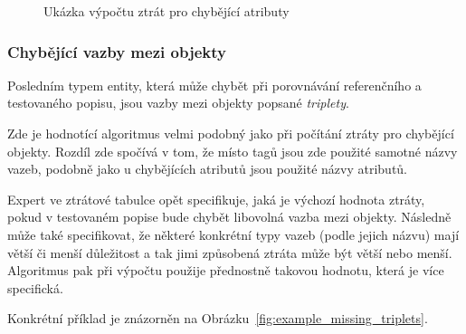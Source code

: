 \begin{figure}[H]
	\caption{Ukázka výpočtu ztrát pro chybějící atributy}\label{fig:example_missing_attrs}
\end{figure}

\subsubsection{Chybějící vazby mezi objekty}
Posledním typem entity, která může chybět při porovnávání referenčního a testovaného popisu, jsou vazby mezi objekty popsané \emph{triplety}.

Zde je hodnotící algoritmus velmi podobný jako při počítání ztráty pro chybějící objekty.
Rozdíl zde spočívá v tom, že místo tagů jsou zde použité samotné názvy vazeb, podobně jako u chybějících atributů jsou použité názvy atributů.

Expert ve ztrátové tabulce opět specifikuje, jaká je výchozí hodnota ztráty, pokud v testovaném popise bude chybět libovolná vazba mezi objekty.
Následně může také specifikovat, že některé konkrétní typy vazeb (podle jejich názvu) mají větší či menší důležitost a tak jimi způsobená ztráta může být větší nebo menší.
Algoritmus pak při výpočtu použije přednostně takovou hodnotu, která je více specifická.

Konkrétní příklad je znázorněn na Obrázku~\ref{fig:example_missing_triplets}.

